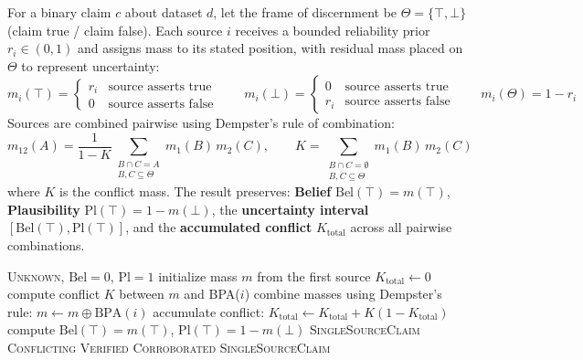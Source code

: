 \documentclass[11pt]{article}
\begin{document}
For a binary claim $c$ about dataset $d$, let the frame of discernment be $\Theta = \{\top, \bot\}$ (claim
true / claim false). Each source $i$ receives a bounded reliability prior $r_i \in (0,1)$ and assigns mass
to its stated position, with residual mass placed on $\Theta$ to represent uncertainty:
\begin{equation}
m_i(\top) = \begin{cases} r_i & \text{source asserts true} \\ 0 & \text{source asserts false} \end{cases}
\qquad
m_i(\bot) = \begin{cases} 0 & \text{source asserts true} \\ r_i & \text{source asserts false} \end{cases}
\qquad
m_i(\Theta) = 1 - r_i
\end{equation}
Sources are combined pairwise using Dempster's rule of combination:
\begin{equation}
m_{12}(A) = \frac{1}{1-K}\sum_{\substack{B \cap C = A \\ B,C \subseteq \Theta}} m_1(B)\,m_2(C), \qquad
K = \sum_{\substack{B \cap C = \emptyset \\ B,C \subseteq \Theta}} m_1(B)\,m_2(C)
\end{equation}
where $K$ is the conflict mass. The result preserves: \textbf{Belief} $\mathrm{Bel}(\top) = m(\top)$,
\textbf{Plausibility} $\mathrm{Pl}(\top) = 1 - m(\bot)$, the \textbf{uncertainty interval}
$[\mathrm{Bel}(\top), \mathrm{Pl}(\top)]$, and the \textbf{accumulated conflict} $K_{\text{total}}$ across
all pairwise combinations.

\begin{algorithm}[h]
\caption{ResolveClaim($c$, sources)}
\label{alg:resolver}
\begin{algorithmic}[1]
  \State \Return \textsc{Unknown}, $\mathrm{Bel}=0$, $\mathrm{Pl}=1$
\EndIf
\State initialize mass $m$ from the first source
\State $K_{\text{total}} \gets 0$
  \State compute conflict $K$ between $m$ and BPA($i$)
  \State combine masses using Dempster's rule: $m \gets m \oplus \mathrm{BPA}(i)$
  \State accumulate conflict: $K_{\text{total}} \gets K_{\text{total}} + K(1-K_{\text{total}})$
\EndFor
\State compute $\mathrm{Bel}(\top) = m(\top)$, $\mathrm{Pl}(\top) = 1 - m(\bot)$
  \State \Return \textsc{SingleSourceClaim}
  \State \Return \textsc{Conflicting}
  \State \Return \textsc{Verified}
  \State \Return \textsc{Corroborated}
\Else
  \State \Return \textsc{SingleSourceClaim} 
\EndIf
\end{algorithmic}
\end{algorithm}
\end{document}
